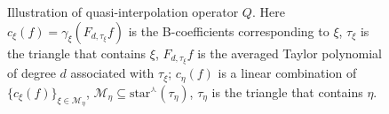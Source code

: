 \documentclass{article}
\begin{document}
\begin{figure}[h]
    \centering
    
    \caption{Illustration of quasi-interpolation operator $Q$. Here $c_\xi(f) = \gamma_\xi(F_{d,\tau_\xi} f)$ is the B-coefficients corresponding to $\xi$, $\tau_\xi$ is the triangle that contains $\xi$, $F_{d,\tau_\xi} f$ is the averaged Taylor polynomial of degree $d$ associated with $\tau_\xi$; $c_\eta(f)$ is a linear combination of $\{c_\xi(f)\}_{\xi\in\mathcal M_\eta}$, $\mathcal M_\eta \subseteq \text{star}^\curlywedge (\tau_\eta)$, $\tau_\eta$ is the triangle that contains $\eta$.}
    \label{fig:quasi_interpolation_operator}
\end{figure}
\end{document}
